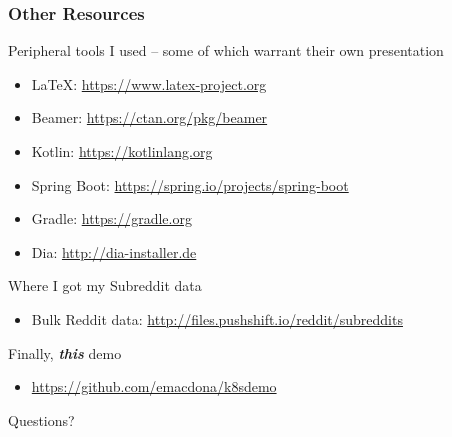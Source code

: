 \documentclass{beamer}
\begin{document}
\begin{frame}
\frametitle{Other Resources}
Peripheral tools I used -- some of which warrant their own presentation
\begin{itemize}
    \item \LaTeX: \href{https://www.latex-project.org}{https://www.latex-project.org}
    \item Beamer: \href{https://ctan.org/pkg/beamer}{https://ctan.org/pkg/beamer}
    \item Kotlin: \href{https://kotlinlang.org}{https://kotlinlang.org}
    \item Spring Boot: \href{https://spring.io/projects/spring-boot}{https://spring.io/projects/spring-boot}
    \item Gradle: \href{https://gradle.org}{https://gradle.org}
    \item Dia: \href{http://dia-installer.de}{http://dia-installer.de}
\end{itemize}
\smallskip
Where I got my Subreddit data
\begin{itemize}
    \item Bulk Reddit data: \href{http://files.pushshift.io/reddit/subreddits}{http://files.pushshift.io/reddit/subreddits}
\end{itemize}
Finally, \textbf{\textit{this}} demo
\begin{itemize}
    \item \href{https://github.com/emacdona/k8sdemo}{https://github.com/emacdona/k8sdemo}
\end{itemize}
\end{frame}

\begin{frame}
    \begin{center}
        \Huge Questions?
    \end{center}
\end{frame}
\end{document}
